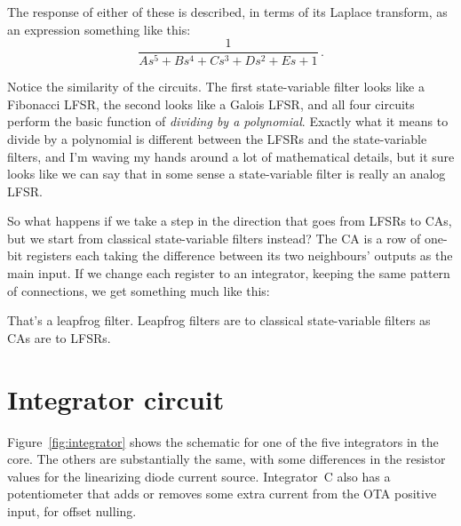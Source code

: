 The response of either of these is described, in terms of its Laplace
transform, as an expression something like this:
\begin{equation*}
\frac{1}{As^5+Bs^4+Cs^3+Ds^2+Es+1}\, .
\end{equation*}

Notice the similarity of the circuits.  The first state-variable filter
looks like a Fibonacci LFSR, the second looks like a Galois LFSR, and all
four circuits perform the basic function of \emph{dividing by a polynomial}. 
Exactly what it means to divide by a polynomial is different between the
LFSRs and the state-variable filters, and I'm waving my hands around a lot
of mathematical details, but it sure looks like we can say that in some
sense a state-variable filter is really an analog LFSR.

So what happens if we take a step in the direction that goes from LFSRs to
CAs, but we start from classical state-variable filters instead?  The CA is
a row of one-bit registers each taking the difference between
its two neighbours' outputs as the main input. 
If we change each register to an integrator, keeping the same pattern of
connections, we get something much like this:

{\centering\par}

That's a leapfrog filter.  Leapfrog filters are to classical state-variable
filters as CAs are to LFSRs.


\section{Integrator circuit}

Figure~\ref{fig:integrator} shows the schematic for one of the five
integrators in the core.  The others are substantially the same, with
some differences in the resistor values for the linearizing diode current
source.  Integrator~C also has a potentiometer that adds or removes some
extra current from the OTA positive input, for offset nulling.

